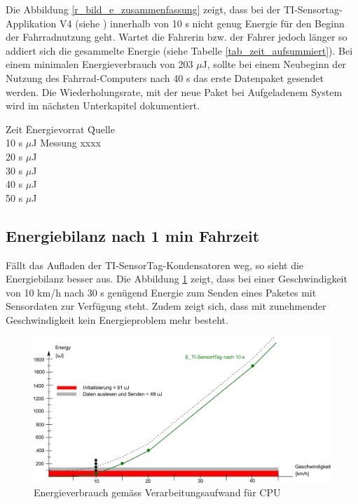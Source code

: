 
Die Abbildung \ref{r_bild_e_zusammenfassung} zeigt, dass bei der TI-Sensortag-Applikation V4 (siehe ) innerhalb von 10 s nicht genug Energie für den Beginn der Fahrradnutzung geht. Wartet die Fahrerin bzw. der Fahrer jedoch länger so addiert sich die gesammelte Energie (siehe Tabelle \ref{tab_zeit_aufsummiert}). Bei einem minimalen Energieverbrauch von 203 $\mu$J, sollte bei einem Neubeginn der Nutzung des Fahrrad-Computers nach 40 s das erste Datenpaket gesendet werden. Die Wiederholungsrate, mit der neue Paket bei Aufgeladenem System wird im nächsten Unterkapitel dokumentiert.

\begin{minipage}{\textwidth}
\label{tab_zeit_aufsummiert}
    \begin{tabbing}
    Zeit  \quad\=  Energievorrat \quad\= Quelle\\[0.8ex]
    10 s   $\mu$J   \>  Messung xxxx \\
    20 s   $\mu$J  \> \\
    30 s   $\mu$J  \> \\
    40 s   $\mu$J  \> \\
    50 s   $\mu$J  \> \\
    \end{tabbing}
\end{minipage}


\subsection{Energiebilanz nach 1 min Fahrzeit}

Fällt das Aufladen der TI-SensorTag-Kondensatoren weg, so sieht die Energiebilanz besser aus. Die Abbildung \ref{r_bild_e_zusammenfassung_ohneSockel} zeigt, dass bei einer Geschwindigkeit von 10 km/h nach 30 s genügend Energie zum Senden eines Paketes mit Sensordaten zur Verfügung steht. Zudem zeigt sich, dass mit zunehmender Geschwindigkeit kein Energieproblem mehr besteht. 


\begin{figure}[ht]
     \includegraphics[width=1\textwidth]{4Resultate/imag/EnergyVerbrauchZusammenfassung_ohneSockel.png}
     \caption{Energieverbrauch gem\"{a}ss Verarbeitungsaufwand für CPU}
     \label{r_bild_e_zusammenfassung_ohneSockel}
\end{figure}


